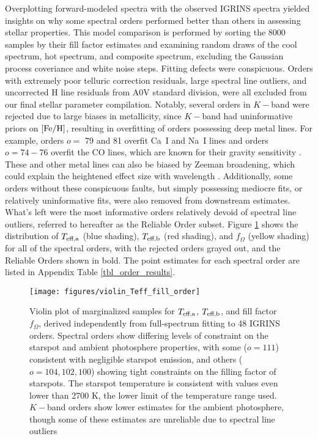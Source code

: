 \documentclass[twocolumn]{emulateapj}%
\begin{document}
Overplotting forward-modeled spectra with the observed IGRINS spectra yielded insights on why some spectral orders performed better than others in assessing stellar properties.  This model comparison is performed by sorting the 8000 samples by their fill factor estimates and examining random draws of the cool spectrum, hot spectrum, and composite spectrum, excluding the Gaussian process coveriance and white noise steps.  Fitting defects were conspicuous.  Orders with extremely poor telluric correction residuals, large spectral line outliers, and uncorrected H line residuals from A0V standard division, were all excluded from our final stellar parameter compilation.  Notably, several orders in $K-$band were rejected due to large biases in metallicity, since $K-$band had uninformative priors on $[{\rm Fe}/{\rm H}]$, resulting in overfitting of orders possessing deep metal lines.  For example, orders $o=$ 79 and 81 overfit Ca~I and Na~I lines and orders $o=74-76$ overfit the CO lines, which are known for their gravity sensitivity \citep{rayner09}.  These and other metal lines can also be biased by Zeeman broadening, which could explain the heightened effect size with wavelength \citep{deen13}.  Additionally, some orders without these conspicuous faults, but simply possessing mediocre fits, or relatively uninformative fits, were also removed from downstream estimates.  What's left were the most informative orders relatively devoid of spectral line outliers, referred to hereafter as the Reliable Order subset.  Figure \ref{fig:TwoTempResults} shows the distribution of $T_\textrm{eff,a}$ (blue shading), $T_\textrm{eff,b}$ (red shading), and $f_{\Omega}$ (yellow shading) for all of the spectral orders, with the rejected orders grayed out, and the Reliable Orders shown in bold.  The point estimates for each spectral order are listed in Appendix Table \ref{tbl_order_results}.

\begin{figure*}
 \centering
 \texttt{[image: figures/violin\_Teff\_fill\_order]} 
 \caption{Violin plot of marginalized samples for $T_\textrm{eff,a}$, $T_\textrm{eff,b}$, and fill factor $f_{\Omega}$, derived independently from full-spectrum fitting to 48 IGRINS orders.  Spectral orders show differing levels of constraint on the starspot and ambient photosphere properties, with some ($o=111$) consistent with negligible starspot emission, and others ($o=104, 102, 100$) showing tight constraints on the filling factor of starspots.  The starspot temperature is consistent with values even lower than 2700 K, the lower limit of the temperature range used.  $K-$band orders show lower estimates for the ambient photosphere, though some of these estimates are unreliable due to spectral line outliers}
 \label{fig:TwoTempResults}
\end{figure*}
\end{document}
